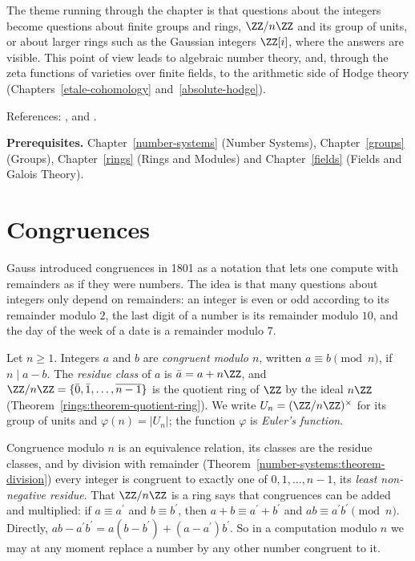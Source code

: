 The theme running through the chapter is that questions about the integers become questions about finite groups and rings, $\ZZ/n\ZZ$ and its group of units, or about larger rings such as the Gaussian
integers $\ZZ[i]$, where the answers are visible. This point of view leads to algebraic number theory, and, through the zeta functions of varieties over finite fields, to the arithmetic side of Hodge theory
(Chapters~\ref{etale-cohomology} and~\ref{absolute-hodge}).

References: \cite{ireland-rosen}, \cite{serre-arithmetic} and \cite{hardy-wright}.

\noindent\textbf{Prerequisites.} Chapter~\ref{number-systems} (Number Systems), Chapter~\ref{groups} (Groups), Chapter~\ref{rings} (Rings and Modules) and Chapter~\ref{fields} (Fields and Galois Theory).

\section{Congruences}\label{number-theory:section-congruences}

Gauss introduced congruences in 1801 as a notation that lets one compute with remainders as if they were numbers. The idea is that many questions about integers only depend on remainders: an integer
is even or odd according to its remainder modulo $2$, the last digit of a number is its remainder modulo $10$, and the day of the week of a date is a remainder modulo $7$.

\begin{definition}\label{number-theory:definition-congruence}
Let $n \geq 1$. Integers $a$ and $b$ are \emph{congruent modulo $n$}, written $a \equiv b \pmod n$, if $n \mid a - b$. The \emph{residue class} of $a$ is $\bar{a} = a + n\ZZ$, and
$\ZZ/n\ZZ = \{\bar{0}, \bar{1}, \ldots, \overline{n - 1}\}$ is the quotient ring of $\ZZ$ by the ideal $n\ZZ$ (Theorem~\ref{rings:theorem-quotient-ring}). We write $U_n = (\ZZ/n\ZZ)^\times$ for its group of units
and $\varphi(n) = |U_n|$; the function $\varphi$ is \emph{Euler's function}.
\end{definition}

Congruence modulo $n$ is an equivalence relation, its classes are the residue classes, and by division with remainder (Theorem~\ref{number-systems:theorem-division}) every integer is congruent to
exactly one of $0, 1, \ldots, n - 1$, its \emph{least non-negative residue}. That $\ZZ/n\ZZ$ is a ring says that congruences can be added and multiplied: if $a \equiv a^{\prime}$ and $b \equiv b^{\prime}$, then
$a + b \equiv a^{\prime} + b^{\prime}$ and $ab \equiv a^{\prime}b^{\prime} \pmod n$. Directly, $ab - a^{\prime}b^{\prime} = a(b - b^{\prime}) + (a - a^{\prime})b^{\prime}$. So in a computation modulo $n$ we may at any
moment replace a number by any other number congruent to it.

